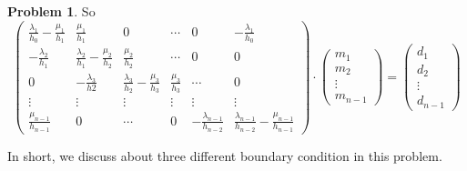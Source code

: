 \documentclass[a4paper]{article}
\theoremstyle{definition}
\newtheorem{problem}{Problem}
\theoremstyle{plain}
\newcommand{\<}{\left<}
\renewcommand{\>}{\right>}
\numberwithin{equation}{problem}
\begin{document}
\begin{problem}
     So 
     \[\begin{pmatrix}
        \frac{\lambda_1}{h_0}-\frac{\mu_1}{h_1}&\frac{\mu_1}{h_1}&0&\cdots&0&-\frac{\lambda_1}{h_0}\\
        -\frac{\lambda_2}{h_1}&\frac{\lambda_2}{h_1}-\frac{\mu_2}{h_2}&\frac{\mu_2}{h_2}&\cdots&0&0\\
        0&-\frac{\lambda_3}{h2}&\frac{\lambda_3}{h_2}-\frac{\mu_3}{h_3}&\frac{\mu_3}{h_3}&\cdots&0\\
        \vdots&\vdots&\vdots&\vdots&\vdots&\vdots\\
        \frac{\mu_{n-1}}{h_{n-1}}&0&\cdots&0&-\frac{\lambda_{n-1}}{h_{n-2}}&\frac{\lambda_{n-1}}{h_{n-2}}-\frac{\mu_{n-1}}{h_{n-1}}
     \end{pmatrix}\cdot\begin{pmatrix}
        m_1\\
        m_2\\
        \vdots\\
        m_{n-1}
     \end{pmatrix}=\begin{pmatrix}
        d_1\\
        d_2\\
        \vdots\\
        d_{n-1}
     \end{pmatrix}\]

     In short, we discuss about three different boundary condition in this problem.


\end{problem}
\end{document}
